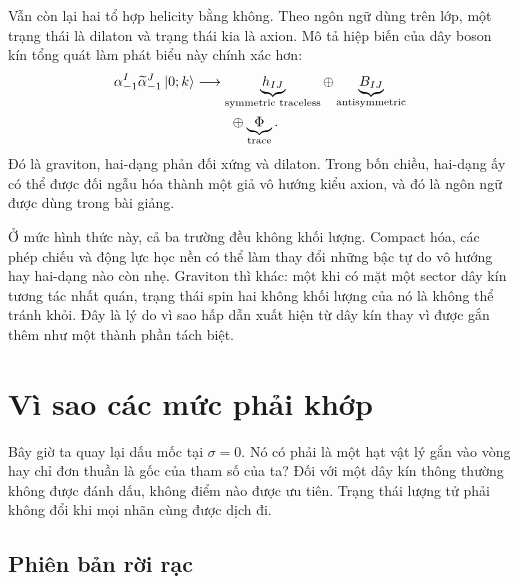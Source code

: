 Vẫn còn lại hai tổ hợp helicity bằng không. Theo ngôn ngữ dùng trên lớp, một trạng thái là dilaton và trạng thái kia là axion. Mô tả hiệp biến của dây boson kín tổng quát làm phát biểu này chính xác hơn:
\begin{equation}
  \begin{aligned}
    \alpha_{-1}^{I}\widetilde\alpha_{-1}^{J}\left\lvert0;k\right\rangle
    &\longrightarrow
    \underbrace{h_{IJ}}_{\text{symmetric traceless}}
    \oplus
    \underbrace{B_{IJ}}_{\text{antisymmetric}}\\
    &\hspace{2.5em}\oplus
    \underbrace{\Phi}_{\text{trace}}.
  \end{aligned}
  \label{eq:l04-massless-tensor-decomposition}
\end{equation}
Đó là graviton, hai-dạng phản đối xứng và dilaton. Trong bốn chiều, hai-dạng ấy có thể được đối ngẫu hóa thành một giả vô hướng kiểu axion, và đó là ngôn ngữ được dùng trong bài giảng.

Ở mức hình thức này, cả ba trường đều không khối lượng. Compact hóa, các phép chiếu và động lực học nền có thể làm thay đổi những bậc tự do vô hướng hay hai-dạng nào còn nhẹ. Graviton thì khác: một khi có mặt một sector dây kín tương tác nhất quán, trạng thái spin hai không khối lượng của nó là không thể tránh khỏi. Đây là lý do vì sao hấp dẫn xuất hiện từ dây kín thay vì được gắn thêm như một thành phần tách biệt.

\section{Vì sao các mức phải khớp}

Bây giờ ta quay lại dấu mốc tại \(\sigma=0\). Nó có phải là một hạt vật lý gắn vào vòng hay chỉ đơn thuần là gốc của tham số của ta? Đối với một dây kín thông thường không được đánh dấu, không điểm nào được ưu tiên. Trạng thái lượng tử phải không đổi khi mọi nhãn cùng được dịch đi.

\subsection{Phiên bản rời rạc}

